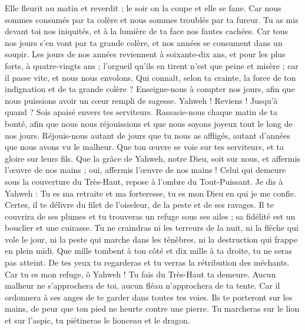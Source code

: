 \begin{multicols}{2}
Elle fleurit au matin et reverdit ; le soir on la coupe et elle se fane.
Car nous sommes consumés par ta colère et nous sommes troublés par ta fureur.
Tu as mis devant toi nos iniquités, et à la lumière de ta face nos fautes cachées.
Car tous nos jours s'en vont par ta grande colère, et nos années se consument dans un soupir.
Les jours de nos années reviennent à soixante-dix ans, et pour les plus forts, à quatre-vingts ans ; l'orgueil qu'ils en tirent n'est que peine et misère ; car il passe vite, et nous nous envolons.
Qui connaît, selon ta crainte, la force de ton indignation et de ta grande colère ?
Enseigne-nous à compter nos jours, afin que nous puissions avoir un cœur rempli de sagesse.
Yahweh ! Reviens ! Jusqu'à quand ? Sois apaisé envers tes serviteurs.
Rassasie-nous chaque matin de ta bonté, afin que nous nous réjouissions et que nous soyons joyeux tout le long de nos jours.
Réjouis-nous autant de jours que tu nous as affligés, autant d'années que nous avons vu le malheur.
Que ton œuvre se voie sur tes serviteurs, et ta gloire sur leurs fils.
Que la grâce de Yahweh, notre Dieu, soit sur nous, et affermis l'œuvre de nos mains ; oui, affermis l'œuvre de nos mains !
\VerseOne{}Celui qui demeure sous la couverture du Très-Haut, repose à l'ombre du Tout-Puissant.
Je dis à Yahweh : Tu es ma retraite et ma forteresse, tu es mon Dieu en qui je me confie.
Certes, il te délivre du filet de l'oiseleur, de la peste et de ses ravages.
Il te couvrira de ses plumes et tu trouveras un refuge sous ses ailes ; sa fidélité est un bouclier et une cuirasse.
Tu ne craindras ni les terreurs de la nuit, ni la flèche qui vole le jour,
ni la peste qui marche dans les ténèbres, ni la destruction qui frappe en plein midi.
Que mille tombent à ton côté et dix mille à ta droite, tu ne seras pas atteint.
De tes yeux tu regarderas et tu verras la rétribution des méchants.
Car tu es mon refuge, ô Yahweh ! Tu fais du Très-Haut ta demeure.
Aucun malheur ne s'approchera de toi, aucun fléau n'approchera de ta tente.
Car il ordonnera à ses anges de te garder dans toutes tes voies.
Ils te porteront sur les mains, de peur que ton pied ne heurte contre une pierre.
Tu marcheras sur le lion et sur l'aspic, tu piétineras le lionceau et le dragon.

\end{multicols}
